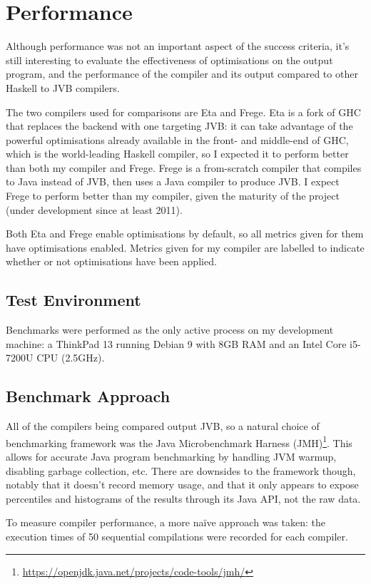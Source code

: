 \documentclass[dissertation.tex]{subfiles}
\begin{document}
\section{Performance}
{
    Although performance was not an important aspect of the success criteria, it's still interesting to evaluate the effectiveness of optimisations on the output program, and the performance of the compiler and its output compared to other Haskell to JVB compilers.

    The two compilers used for comparisons are Eta and Frege. Eta is a fork of GHC that replaces the backend with one targeting JVB: it can take advantage of the powerful optimisations already available in the front- and middle-end of GHC, which is the world-leading Haskell compiler, so I expected it to perform better than both my compiler and Frege. Frege is a from-scratch compiler that compiles to Java instead of JVB, then uses a Java compiler to produce JVB. I expect Frege to perform better than my compiler, given the maturity of the project (under development since at least 2011).

    Both Eta and Frege enable optimisations by default, so all metrics given for them have optimisations enabled. Metrics given for my compiler are labelled to indicate whether or not optimisations have been applied.

    \subsection{Test Environment}\label{sec:test-environment}
    {
        Benchmarks were performed as the only active process on my development machine: a ThinkPad 13 running Debian 9 with 8GB RAM and an Intel Core i5-7200U CPU (2.5GHz).
    }
    \subsection{Benchmark Approach}
    {
        All of the compilers being compared output JVB, so a natural choice of benchmarking framework was the Java Microbenchmark Harness (JMH)\footnote{\url{https://openjdk.java.net/projects/code-tools/jmh/}}. This allows for accurate Java program benchmarking by handling JVM warmup, disabling garbage collection, etc. There are downsides to the framework though, notably that it doesn't record memory usage, and that it only appears to expose percentiles and histograms of the results through its Java API, not the raw data.

        To measure compiler performance, a more na{\"i}ve approach was taken: the execution times of 50 sequential compilations were recorded for each compiler.
        
}}
\end{document}
